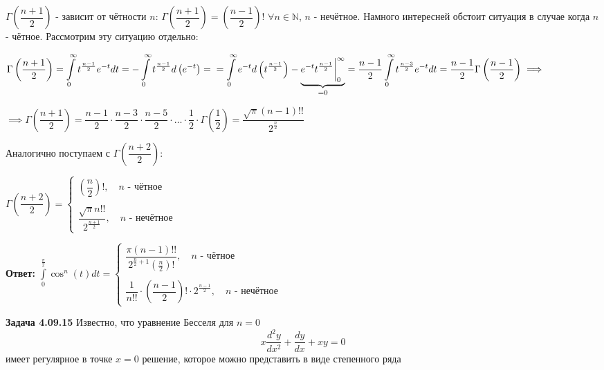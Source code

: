\documentclass[a4paper, 12pt]{article}
\begin{document}
	\quad $\Gamma\left(\dfrac{n+1}{2}\right)$ - зависит от чётности $n$: $\Gamma\left(\dfrac{n+1}{2}\right) =\left(\dfrac{n-1}{2}\right)!$ \newline $\forall n \in \mathbb{N} $, $n$ - нечётное. Намного интересней обстоит ситуация в случае когда $n$ - чётное. Рассмотрим эту ситуацию отдельно:
	
	\begin{center}
		$\Gamma\left(\dfrac{n+1}{2}\right) = \displaystyle\int\limits_{0}^{\infty} t^{\frac{n-1}{2}} e^{-t} dt = -\displaystyle\int\limits_{0}^{\infty} t^{\frac{n-1}{2}} d\left(e^{-t}\right) =\newline = \displaystyle\int\limits_{0}^{\infty} e^{-t} d\left(t^{\frac{n-1}{2}}\right) - \underbrace{e^{-t} t^{\frac{n-1}{2}} \bigg|_{0}^{\infty}}_{=0} = \dfrac{n-1}{2} \displaystyle\int\limits_{0}^{\infty} t^{\frac{n-3}{2}} e^{-t} dt = \dfrac{n-1}{2} \Gamma\left(\dfrac{n-1}{2}\right) \implies$
		
		$\implies \Gamma\left(\dfrac{n+1}{2}\right) = \dfrac{n-1}{2} \cdot \dfrac{n-3}{2} \cdot \dfrac{n-5}{2}\cdot \ldots \cdot\dfrac{1}{2} \cdot \Gamma\left(\dfrac{1}{2}\right) = \dfrac{\sqrt{\pi} (n-1)!!}{2^{\frac{n}{2}}}$
	\end{center}
	
	\quad Аналогично поступаем с $\Gamma\left(\dfrac{n+2}{2}\right)$:
	
	\begin{center}
		$\Gamma\left(\dfrac{n+2}{2}\right) = \begin{cases}
			\left(\dfrac{n}{2}\right)!, \quad n \text{ - чётное} \\
			\\
			\dfrac{\sqrt{\pi} n!!}{2^{\frac{n+1}{2}}}, \quad n \text{ - нечётное}
		\end{cases}$
	\end{center}
	
	\quad \textbf{Ответ:} $\displaystyle\int\limits_{0}^{\frac{\pi}{2}} \cos^n (t) dt= \begin{cases}
		\dfrac{\pi (n-1)!!}{2^{\frac{n}{2} + 1} \left(\frac{n}{2}\right)! }, \quad n \text{ - чётное} \\ 
		\\
		\dfrac{1}{n!!} \cdot \left(\dfrac{n-1}{2}\right)! \cdot 2^{\frac{n-1}{2}} , \quad n \text{ - нечётное}
	\end{cases}$ 
	
	
	\quad \textbf{Задача 4.09.15} Известно, что уравнение Бесселя для \( n = 0 \)
	\begin{equation}
		x \dfrac{d^2 y}{dx^2} + \dfrac{dy}{dx} + x y = 0
	\end{equation}
	имеет регулярное в точке \( x = 0 \) решение,
	которое можно представить в виде степенного ряда
	
\end{document}
